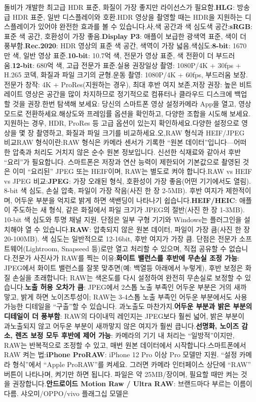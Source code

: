 돌비가 개발한 최고급 HDR 표준, 화질이 가장 좋지만 라이선스가 필요함.\textbf{HLG}: 방송급 HDR 표준, 일반 디스플레이와 호환.HDR 영상을 촬영할 때는 HDR을 지원하는 디스플레이가 있어야 완전한 효과를 볼 수 있습니다.사,색 공간과 색 심도색 공간:\textbf{sRGB}: 표준 색 공간, 호환성이 가장 좋음.\textbf{Display P3}: 애플이 보급한 광색역 표준, 색이 더 풍부함.\textbf{Rec.2020}: HDR 영상의 표준 색 공간, 색역이 가장 넓음.색심도:\textbf{8-bit}: 1670만 색, 일반 영상 표준.\textbf{10-bit}: 10.7억 색, 전문가 영상 표준, 색 전환이 더 부드러움.\textbf{12-bit}: 680억 색, 고급 전문가 표준.실용 권장일상 촬영: 1080P/4K + 30fps + H.265 코덱, 화질과 파일 크기의 균형.운동 촬영: 1080P/4K + 60fps, 부드러움 보장.전문가 창작: 4K + ProRes(지원하는 경우), 최대 후반 여지 보존.저장 권장: 높은 비트레이트 영상은 공간을 많이 차지하므로 정기적으로 컴퓨터나 클라우드 디스크에 백업할 것을 권장.한번 탐색해 보세요: 당신의 스마트폰 영상 설정카메라 App을 열고, 영상 모드로 전환하세요.해상도와 프레임률 옵션을 확인하고, 다양한 조합을 시도해 보세요.지원하는 경우, HDR, ProRes 등 고급 옵션이 있는지 확인하세요.다양한 설정으로 영상을 몇 장 촬영하고, 화질과 파일 크기를 비교하세요.오,RAW 형식과 HEIF/JPEG 비교RAW 형식이란:RAW 형식은 카메라 센서가 기록한 “원본 데이터”입니다—어떠한 압축과 처리도 거치지 않은 순수 원본 정보입니다. 신선한 식재료와 같아서 후반 “요리”가 필요합니다. 스마트폰은 저장과 연산 능력이 제한되어 기본값으로 촬영된 것은 이미 “요리된” JPEG 또는 HEIF이며, RAW는 별도로 켜야 합니다.RAW vs HEIF vs JPEG 비교:\textbf{JPEG}: 가장 오래된 형식, 호환성이 가장 좋음(어떤 기기에서도 열림). 8-bit 색 심도, 손실 압축, 파일이 가장 작음(사진 한 장 2-5MB). 후반 여지가 제한적이며, 어두운 부분을 억지로 밝게 하면 색밴딩이 나타나기 쉽습니다.\textbf{HEIF/HEIC}: 애플이 주도하는 새 형식, 같은 화질에서 파일 크기가 JPEG의 절반(사진 한 장 1-3MB). 10-bit 색 심도와 투명 채널 지원. 단점은 일부 구형 기기와 Windows는 플러그인을 설치해야 열 수 있습니다.\textbf{RAW}: 압축되지 않은 원본 데이터, 파일이 가장 큼(사진 한 장 20-100MB). 색 심도는 일반적으로 12-16bit, 후반 여지가 가장 큼. 단점은 전문가 소프트웨어(Lightroom, Snapseed 등)로만 열고 처리할 수 있으며, 직접 공유할 수 없습니다.전문가 사진사가 RAW를 찍는 이유:\textbf{화이트 밸런스를 후반에 무손실 조정 가능}: JPEG에서 화이트 밸런스를 잘못 맞추면(예: 백열등 아래에서 누렇게), 후반 보정은 화질 손실을 초래합니다; RAW는 색온도를 다시 설정하여 완전히 무손실로 보정할 수 있습니다.\textbf{노출 허용 오차가 큼}: JPEG에서 2스톱 노출 부족인 어두운 부분은 거의 새까맣고, 밝게 하면 노이즈투성이; RAW는 3-4스톱 노출 부족인 어두운 부분에서도 사용 가능한 디테일을 “구출”할 수 있습니다. 과노출도 마찬가지.\textbf{어두운 부분과 밝은 부분의 디테일이 더 풍부함}: RAW의 다이내믹 레인지는 JPEG보다 훨씬 넓어, 밝은 부분이 과노출되지 않고 어두운 부분이 새까맣지 않은 여지가 훨씬 큽니다.\textbf{선명화, 노이즈 감소, 렌즈 보정 모두 후반에 제어 가능}: 카메라의 기기 내 처리는 “일방적”이지만, RAW는 반복적으로 조정할 수 있고, 매번 원본 데이터에서 시작합니다.스마트폰에서 RAW 켜는 법:\textbf{iPhone ProRAW}: iPhone 12 Pro 이상 Pro 모델만 지원. “설정 카메라 형식”에서 “Apple ProRAW”를 켜세요. 그러면 카메라 인터페이스 상단에 “RAW” 버튼이 나타나며, 켜기만 하면 됩니다. 파일은 약 25MB/장이며, 필요할 때만 켜는 것을 권장합니다.\textbf{안드로이드 Motion Raw / Ultra RAW}: 브랜드마다 부르는 이름이 다름. 샤오미/OPPO/vivo 플래그십 모델은 
